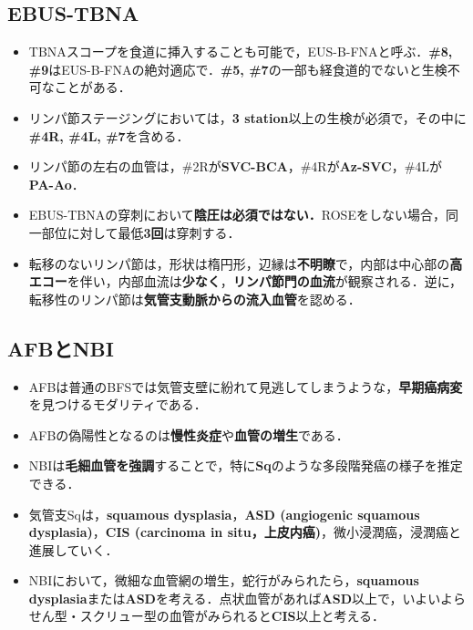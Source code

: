 \subsection{EBUS-TBNA}
\begin{itemize}
\item TBNAスコープを食道に挿入することも可能で，EUS-B-FNAと呼ぶ．\textbf{\#8, \#9}はEUS-B-FNAの絶対適応で．\textbf{\#5, \#7}の一部も経食道的でないと生検不可なことがある．
\item リンパ節ステージングにおいては，\textbf{3 station}以上の生検が必須で，その中に\textbf{\#4R, \#4L, \#7}を含める．
\item リンパ節の左右の血管は，\#2Rが\textbf{SVC-BCA}，\#4Rが\textbf{Az-SVC}，\#4Lが\textbf{PA-Ao}．
\item EBUS-TBNAの穿刺において\textbf{陰圧は必須ではない．}ROSEをしない場合，同一部位に対して最低\textbf{3回}は穿刺する．
\item 転移のないリンパ節は，形状は楕円形，辺縁は\textbf{不明瞭}で，内部は中心部の\textbf{高エコー}を伴い，内部血流は\textbf{少なく}，\textbf{リンパ節門の血流}が観察される．逆に，転移性のリンパ節は\textbf{気管支動脈からの流入血管}を認める．
\end{itemize}

\subsection{AFBとNBI}

\begin{itemize}

\item AFBは普通のBFSでは気管支壁に紛れて見逃してしまうような，\textbf{早期癌病変}を見つけるモダリティである．
\item AFBの偽陽性となるのは\textbf{慢性炎症}や\textbf{血管の増生}である．
\item NBIは\textbf{毛細血管を強調}することで，特に\textbf{Sq}のような多段階発癌の様子を推定できる．
\item 気管支Sqは，\textbf{squamous dysplasia}，\textbf{ASD (angiogenic squamous dysplasia)}，\textbf{CIS (carcinoma in situ，上皮内癌)}，微小浸潤癌，浸潤癌と進展していく．
\item NBIにおいて，微細な血管網の増生，蛇行がみられたら，\textbf{squamous dysplasia}または\textbf{ASD}を考える．点状血管があれば\textbf{ASD}以上で，いよいよらせん型・スクリュー型の血管がみられると\textbf{CIS}以上と考える．



\end{itemize}

